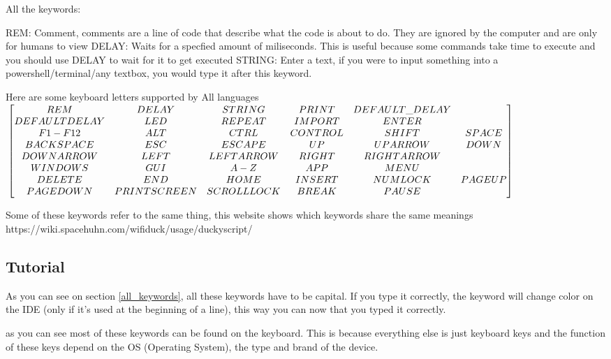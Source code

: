 \documentclass[a4paper,12pt]{article}
\begin{document}
All the keywords:

REM: Comment, comments are a line of code that describe what the code is about to do. They are ignored by the computer and are only for humans to view
DELAY: Waits for a specfied amount of miliseconds. This is useful because some commands take time to execute and you should use DELAY to wait for it to get executed
STRING: Enter a text, if you were to input something into a powershell/terminal/any textbox, you would type it after this keyword.

Here are some keyboard letters supported by All languages
\scriptsize
$\\\begin{bmatrix} 
REM & DELAY & STRING & PRINT & DEFAULT\_DELAY
\\DEFAULTDELAY & LED & REPEAT & IMPORT & ENTER
\\F1-F12 & ALT & CTRL & CONTROL & SHIFT & SPACE
\\BACKSPACE & ESC & ESCAPE & UP & UPARROW & DOWN
\\DOWNARROW & LEFT & LEFTARROW & RIGHT & RIGHTARROW
\\WINDOWS & GUI & A-Z & APP & MENU
\\DELETE & END & HOME & INSERT & NUMLOCK & PAGEUP
\\PAGEDOWN & PRINTSCREEN & SCROLLLOCK & BREAK & PAUSE
\end{bmatrix}\\\\$
\normalsize

Some of these keywords refer to the same thing, this website shows which keywords share the same meanings
https://wiki.spacehuhn.com/wifiduck/usage/duckyscript/

\subsection{Tutorial}

As you can see on section \ref{all_keywords}, all these keywords have to be capital. If you type it correctly, the keyword will change color on the IDE (only if it's used at the beginning of a line), this way you can now that you typed it correctly.

as you can see most of these keywords can be found on the keyboard. This is because everything else is just keyboard keys and the function of these keys depend on the OS (Operating System), the type and brand of the device. 
\end{document}
